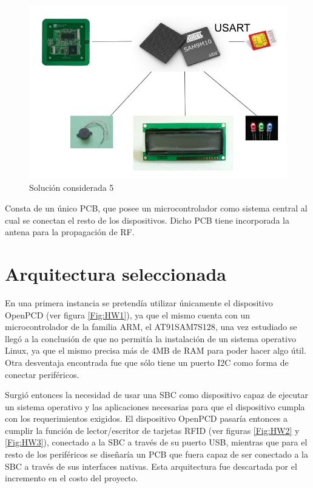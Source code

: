 \begin{itemize}
\begin{figure}[H]
\centering
  \begin{center}
  \includegraphics[scale=.25]{Imagenes/4.jpg} 
  \end{center}
  \caption{Solución considerada 5}\label{Fig:HW5} 
\end{figure}

Consta de un único PCB, que posee un microcontrolador como sistema central al cual se
conectan el resto de los dispositivos. Dicho PCB tiene incorporada la antena para la
propagación de RF.

\end{itemize}

\section{Arquitectura seleccionada}
En una primera instancia se pretendía utilizar únicamente el dispositivo OpenPCD (ver figura \ref{Fig:HW1}), ya que el mismo cuenta con un microcontrolador de la familia ARM, el AT91SAM7S128, una vez estudiado se llegó a la conclusión de que no permitía la instalación de un sistema operativo Linux, ya que el mismo precisa más de 4MB de RAM para poder hacer algo útil. Otra desventaja encontrada fue que sólo tiene un puerto I2C como forma de conectar periféricos.

Surgió entonces la necesidad de usar una SBC como dispositivo capaz de ejecutar un sistema operativo y las aplicaciones necesarias para que el dispositivo cumpla con los requerimientos exigidos. El dispositivo OpenPCD pasaría entonces a cumplir la función de lector/escritor de tarjetas RFID (ver figuras \ref{Fig:HW2} y \ref{Fig:HW3}), conectado a la SBC a través de su puerto USB, mientras que para el resto de los periféricos se diseñaría un PCB que fuera capaz de ser conectado a la SBC a través de sus interfaces nativas. Esta arquitectura fue descartada por el incremento en el costo del proyecto.

